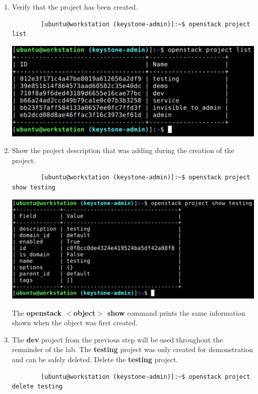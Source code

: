 \documentclass[letterpaper, 12pt]{article}
\begin{document}
\begin{enumerate}
    \item Verify that the project has been created.
    \begin{lstlisting}
        [ubuntu@workstation (keystone-admin)]:~$ openstack project list
    \end{lstlisting}

    \begin{center}
        \includegraphics[width=\linewidth]{images/part2/step5.png}
    \end{center}

    \item Show the project description that was adding during the creation of the project.
    \begin{lstlisting}
        [ubuntu@workstation (keystone-admin)]:~$ openstack project show testing
    \end{lstlisting}

    \begin{center}
        \includegraphics[width=\linewidth]{images/part2/step6.png}
    \end{center}

    \begin{tipbox}
        The \textbf{openstack $<$object$>$ show} command prints the same information shown when the object was first created.
    \end{tipbox}

    \item The \textbf{dev} project from the previous step will be used throughout the remainder of the lab.
    The \textbf{testing} project was only created for demonstration and can be safely deleted.
    Delete the \textbf{testing} project.
    \begin{lstlisting}
        [ubuntu@workstation (keystone-admin)]:~$ openstack project delete testing
    \end{lstlisting}


\end{enumerate}
\end{document}
